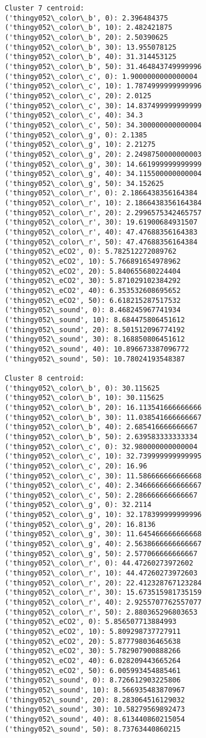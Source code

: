 \documentclass[11pt]{article}
\begin{document}
\begin{Verbatim}[commandchars=\\\{\}]
Cluster 7 centroid:
('thingy052\_color\_b', 0): 2.396484375
('thingy052\_color\_b', 10): 2.482421875
('thingy052\_color\_b', 20): 2.50390625
('thingy052\_color\_b', 30): 13.955078125
('thingy052\_color\_b', 40): 31.314453125
('thingy052\_color\_b', 50): 31.464843749999996
('thingy052\_color\_c', 0): 1.9000000000000004
('thingy052\_color\_c', 10): 1.7874999999999996
('thingy052\_color\_c', 20): 2.0125
('thingy052\_color\_c', 30): 14.837499999999999
('thingy052\_color\_c', 40): 34.3
('thingy052\_color\_c', 50): 34.300000000000004
('thingy052\_color\_g', 0): 2.1385
('thingy052\_color\_g', 10): 2.21275
('thingy052\_color\_g', 20): 2.2498750000000003
('thingy052\_color\_g', 30): 14.661999999999999
('thingy052\_color\_g', 40): 34.115500000000004
('thingy052\_color\_g', 50): 34.152625
('thingy052\_color\_r', 0): 2.1866438356164384
('thingy052\_color\_r', 10): 2.1866438356164384
('thingy052\_color\_r', 20): 2.2996575342465757
('thingy052\_color\_r', 30): 19.61900684931507
('thingy052\_color\_r', 40): 47.47688356164383
('thingy052\_color\_r', 50): 47.47688356164384
('thingy052\_eCO2', 0): 5.782512272089762
('thingy052\_eCO2', 10): 5.766891654978962
('thingy052\_eCO2', 20): 5.840655680224404
('thingy052\_eCO2', 30): 5.871029102384292
('thingy052\_eCO2', 40): 6.353532608695652
('thingy052\_eCO2', 50): 6.618215287517532
('thingy052\_sound', 0): 8.468245967741934
('thingy052\_sound', 10): 8.684475806451612
('thingy052\_sound', 20): 8.501512096774192
('thingy052\_sound', 30): 8.168850806451612
('thingy052\_sound', 40): 10.896673387096772
('thingy052\_sound', 50): 10.78024193548387

Cluster 8 centroid:
('thingy052\_color\_b', 0): 30.115625
('thingy052\_color\_b', 10): 30.115625
('thingy052\_color\_b', 20): 16.113541666666666
('thingy052\_color\_b', 30): 11.038541666666667
('thingy052\_color\_b', 40): 2.685416666666667
('thingy052\_color\_b', 50): 2.639583333333334
('thingy052\_color\_c', 0): 32.980000000000004
('thingy052\_color\_c', 10): 32.739999999999995
('thingy052\_color\_c', 20): 16.96
('thingy052\_color\_c', 30): 11.586666666666668
('thingy052\_color\_c', 40): 2.3466666666666667
('thingy052\_color\_c', 50): 2.286666666666667
('thingy052\_color\_g', 0): 32.2114
('thingy052\_color\_g', 10): 32.178399999999996
('thingy052\_color\_g', 20): 16.8136
('thingy052\_color\_g', 30): 11.645466666666668
('thingy052\_color\_g', 40): 2.5638666666666667
('thingy052\_color\_g', 50): 2.577066666666667
('thingy052\_color\_r', 0): 44.47260273972602
('thingy052\_color\_r', 10): 44.47260273972603
('thingy052\_color\_r', 20): 22.412328767123284
('thingy052\_color\_r', 30): 15.673515981735159
('thingy052\_color\_r', 40): 2.9255707762557077
('thingy052\_color\_r', 50): 2.880365296803653
('thingy052\_eCO2', 0): 5.856507713884993
('thingy052\_eCO2', 10): 5.809298737727911
('thingy052\_eCO2', 20): 5.877798036465638
('thingy052\_eCO2', 30): 5.782907900888266
('thingy052\_eCO2', 40): 6.028209443665264
('thingy052\_eCO2', 50): 6.005993454885461
('thingy052\_sound', 0): 8.726612903225806
('thingy052\_sound', 10): 8.566935483870967
('thingy052\_sound', 20): 8.283064516129032
('thingy052\_sound', 30): 10.58279569892473
('thingy052\_sound', 40): 8.613440860215054
('thingy052\_sound', 50): 8.73763440860215


\end{Verbatim}
\end{document}

